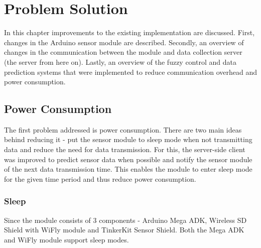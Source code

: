 
\chapter{Problem Solution} %

In this chapter improvements to the existing implementation are discussed. First, changes in the Arduino sensor module are described. Secondly, an overview of changes in the communication between the module and data collection server (the server from here on). Lastly, an overview of the fuzzy control and data prediction systems that were implemented to reduce communication overhead and power consumption.


\ifpdf
    \graphicspath{{X/figures/PNG/}{X/figures/PDF/}{X/figures/}}
\else
    \graphicspath{{X/figures/EPS/}{X/figures/}}
\fi

\section{Power Consumption}

The first problem addressed is power consumption. There are two main ideas behind reducing it - put the sensor module to sleep mode when not transmitting data and reduce the need for data transmission. For this, the server-side client was improved to predict sensor data when possible and notify the sensor module of the next data transmission time. This enables the module to enter sleep mode for the given time period and thus reduce power consumption. 

\subsection{Sleep}

Since the module consists of 3 components - Arduino Mega ADK, Wireless SD Shield with WiFly module and TinkerKit Sensor Shield. Both the Mega ADK and WiFly module support sleep modes. 


